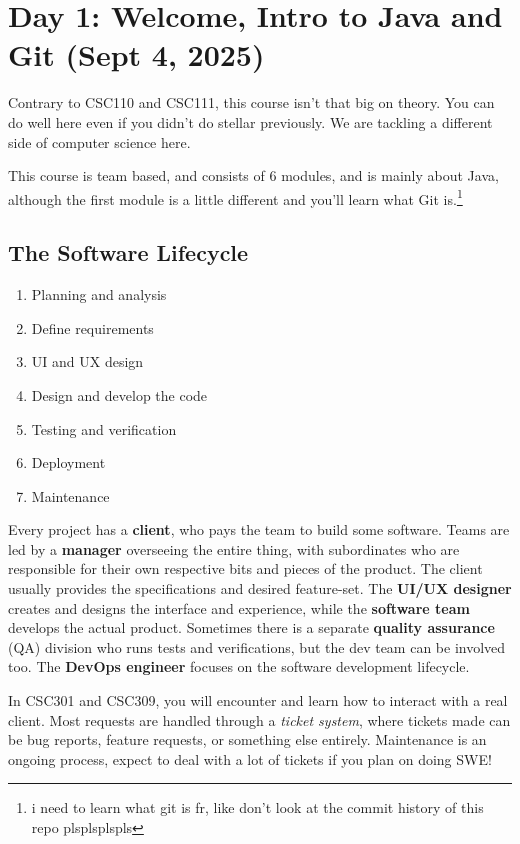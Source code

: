 \section{Day 1: Welcome, Intro to Java and Git (Sept 4, 2025)}

Contrary to CSC110 and CSC111, this course isn't that big on theory. You can do well here even if you didn't do stellar previously. We are tackling a different side of computer science here.

This course is team based, and consists of 6 modules, and is mainly about Java, although the first module is a little different and you'll learn what Git is.\footnote{i need to learn what git is fr, like don't look at the commit history of this repo plsplsplspls}

\subsection{The Software Lifecycle}
\begin{enumerate}
\item Planning and analysis
\item Define requirements
\item UI and UX design
\item Design and develop the code
\item Testing and verification
\item Deployment
\item Maintenance
\end{enumerate}
Every project has a \textbf{client}, who pays the team to build some software. Teams are led by a \textbf{manager} overseeing the entire thing, with subordinates who are responsible for their own respective bits and pieces of the product. The client usually provides the specifications and desired feature-set. The \textbf{UI/UX designer} creates and designs the interface and experience, while the \textbf{software team} develops the actual product. Sometimes there is a separate \textbf{quality assurance} (QA) division who runs tests and verifications, but the dev team can be involved too. The \textbf{DevOps engineer} focuses on the software development lifecycle.

In CSC301 and CSC309, you will encounter and learn how to interact with a real client. Most requests are handled through a \textit{ticket system}, where tickets made can be bug reports, feature requests, or something else entirely. Maintenance is an ongoing process, expect to deal with a lot of tickets if you plan on doing SWE!

